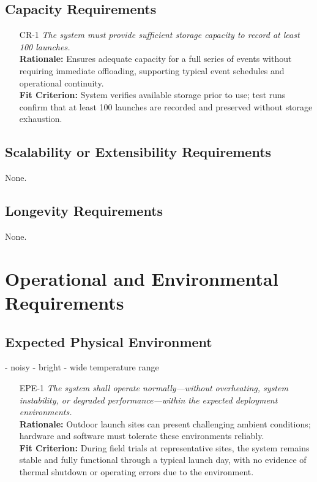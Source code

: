 \documentclass[12pt]{article}
\begin{document}
\subsection{Capacity Requirements}
\begin{itemize}[leftmargin=*]
  \item[CR-1] \emph{The system must provide sufficient storage capacity to record at
          least 100 launches.}\\[2mm]
        \textbf{Rationale:} Ensures adequate capacity for a full series of events without requiring immediate offloading, supporting typical event schedules and operational continuity.\\
        \textbf{Fit Criterion:} System verifies available storage prior to use; test runs confirm that at least 100 launches are recorded and preserved without storage exhaustion.
\end{itemize}

\subsection{Scalability or Extensibility Requirements}

None.

\subsection{Longevity Requirements}

None.

\section{Operational and Environmental Requirements}
\subsection{Expected Physical Environment}
- noisy
- bright
- wide temperature range
\begin{itemize}[leftmargin=*]
  \item[EPE-1] \emph{The system shall operate normally—without overheating, system
          instability, or degraded performance—within the expected deployment
          environments.}\\[2mm]
        \textbf{Rationale:} Outdoor launch sites can present challenging ambient conditions; hardware and software must tolerate these environments reliably.\\
        \textbf{Fit Criterion:} During field trials at representative sites, the system remains stable and fully functional through a typical launch day, with no evidence of thermal shutdown or operating errors due to the environment.
\end{itemize}
\end{document}
